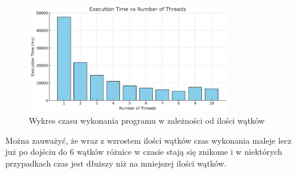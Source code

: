 \documentclass[11pt]{article}
\begin{document}
    \begin{figure}
        \centering
        \includegraphics[width=0.8\textwidth]{threads-plot.png}
        \caption{Wykres czasu wykonania programu w zależności od ilości wątków}
        \label{fig:bar_chart}
    \end{figure}

    Można zauważyć, że wraz z wzrostem ilości wątków czas wykonania maleje lecz już po dojściu do 6 wątków różnice w czasie
    stają się znikome i w niektórych przypadkach czas jest dłuższy niż na mniejszej ilości wątków.
\end{document}
